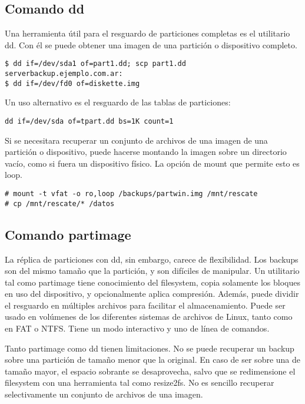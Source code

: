\subsection{Comando dd}
Una herramienta útil para el resguardo de particiones completas es el utilitario dd. Con él se puede obtener una imagen de una partición o dispositivo completo. 

\begin{lstlisting}
$ dd if=/dev/sda1 of=part1.dd; scp part1.dd serverbackup.ejemplo.com.ar:
$ dd if=/dev/fd0 of=diskette.img
\end{lstlisting}

Un uso alternativo es el resguardo de las tablas de particiones:

\lstinline$dd if=/dev/sda of=tpart.dd bs=1K count=1$

Si se necesitara recuperar un conjunto de archivos de una imagen de una partición o dispositivo, puede hacerse montando la imagen sobre un directorio vacío, como si fuera un dispositivo físico. La opción de mount que permite esto es loop.

\begin{lstlisting}
# mount -t vfat -o ro,loop /backups/partwin.img /mnt/rescate
# cp /mnt/rescate/* /datos
\end{lstlisting}


\subsection{Comando partimage}

La réplica de particiones con dd, sin embargo, carece de flexibilidad. Los backups son del mismo tamaño que la partición, y son difíciles de manipular. Un utilitario tal como partimage tiene conocimiento del filesystem, copia solamente los bloques en uso del dispositivo, y opcionalmente aplica compresión. Además, puede dividir el resguardo en múltiples archivos para facilitar el almacenamiento. Puede ser usado en volúmenes de los diferentes sistemas de archivos de Linux, tanto como en FAT o NTFS. Tiene un modo interactivo y uno de línea de comandos.

Tanto partimage como dd tienen limitaciones. No se puede recuperar un backup sobre una partición de tamaño menor que la original. En caso de ser sobre una de tamaño mayor, el espacio sobrante se desaprovecha, salvo que se redimensione el filesystem con una herramienta tal como resize2fs. No es sencillo recuperar selectivamente un conjunto de archivos de una imagen.


